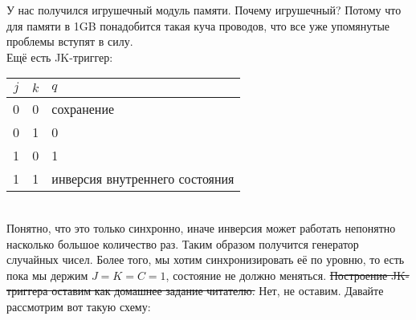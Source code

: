 \documentclass{article}
\begin{document}
\begin{center}
    \end{center}
    У нас получился игрушечный модуль памяти. Почему игрушечный? Потому что для памяти в 1GB понадобится такая куча проводов, что все уже упомянутые проблемы вступят в силу.\\
    Ещё есть JK-триггер:
    \begin{tabular}{cc|l}
        $j$ & $k$ & $q$\\
        \hline
        0 & 0 & сохранение\\
        0 & 1 & 0\\
        1 & 0 & 1\\
        1 & 1 & инверсия внутреннего состояния\\
    \end{tabular}\\
    Понятно, что это только синхронно, иначе инверсия может работать непонятно насколько большое количество раз. Таким образом получится генератор случайных чисел. Более того, мы хотим синхронизировать её по уровню, то есть пока мы держим $J=K=C=1$, состояние не должно меняться. \sout{Построение JK-триггера оставим как домашнее задание читателю.} Нет, не оставим. Давайте рассмотрим вот такую схему:
\end{document}
